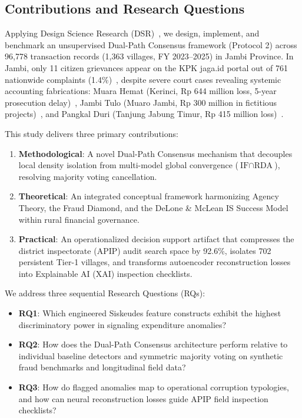 \documentclass[conference]{IEEEtran}
\begin{document}
\subsection{Contributions and Research Questions}

Applying Design Science Research (DSR)~\cite{ref10}, we design, implement, and benchmark an unsupervised Dual-Path Consensus framework (Protocol 2) across 96,778 transaction records (1,363 villages, FY 2023--2025) in Jambi Province. In Jambi, only 11 citizen grievances appear on the KPK jaga.id portal out of 761 nationwide complaints (1.4\%)~\cite{ref26}, despite severe court cases revealing systemic accounting fabrications: Muara Hemat (Kerinci, Rp 644 million loss, 5-year prosecution delay)~\cite{ref28,ref30}, Jambi Tulo (Muaro Jambi, Rp 300 million in fictitious projects)~\cite{ref29}, and Pangkal Duri (Tanjung Jabung Timur, Rp 415 million loss)~\cite{ref31}.

This study delivers three primary contributions:
\begin{enumerate}
    \item \textbf{Methodological}: A novel Dual-Path Consensus mechanism that decouples local density isolation from multi-model global convergence ($\text{IF} \cap \text{RDA}$), resolving majority voting cancellation.
    \item \textbf{Theoretical}: An integrated conceptual framework harmonizing Agency Theory, the Fraud Diamond, and the DeLone \& McLean IS Success Model within rural financial governance.
    \item \textbf{Practical}: An operationalized decision support artifact that compresses the district inspectorate (APIP) audit search space by 92.6\%, isolates 702 persistent Tier-1 villages, and transforms autoencoder reconstruction losses into Explainable AI (XAI) inspection checklists.
\end{enumerate}

We address three sequential Research Questions (RQs):
\begin{itemize}
    \item \textbf{RQ1}: Which engineered Siskeudes feature constructs exhibit the highest discriminatory power in signaling expenditure anomalies?
    \item \textbf{RQ2}: How does the Dual-Path Consensus architecture perform relative to individual baseline detectors and symmetric majority voting on synthetic fraud benchmarks and longitudinal field data?
    \item \textbf{RQ3}: How do flagged anomalies map to operational corruption typologies, and how can neural reconstruction losses guide APIP field inspection checklists?
\end{itemize}
\end{document}

